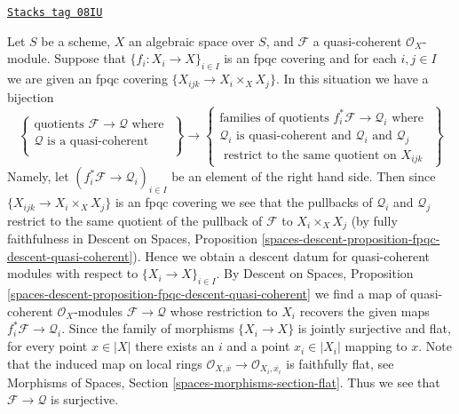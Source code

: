 \begin{remark}[Q sheaf]
\label{quot-remark-q-sheaf}
\href{https://stacks.math.columbia.edu/tag/08IU}{\texttt{Stacks tag 08IU}}

Let $S$ be a scheme, $X$ an algebraic space over $S$, and $\mathcal{F}$
a quasi-coherent $\mathcal{O}_X$-module. Suppose that
$\{f_i : X_i \to X\}_{i \in I}$
is an fpqc covering and for each $i, j \in I$ we are given an fpqc covering
$\{X_{ijk} \to X_i \times_X X_j\}$. In this situation we have a bijection
$$
\left\{
\begin{matrix}
\text{quotients }\mathcal{F} \to \mathcal{Q}\text{ where } \\
\mathcal{Q}\text{ is a quasi-coherent }\\
\end{matrix}
\right\}
\longrightarrow
\left\{
\begin{matrix}
\text{families of quotients }f_i^*\mathcal{F} \to \mathcal{Q}_i
\text{ where } \\
\mathcal{Q}_i\text{ is quasi-coherent and }
\mathcal{Q}_i\text{ and }\mathcal{Q}_j\\
\text{ restrict to the same quotient on }X_{ijk}
\end{matrix}
\right\}
$$
Namely, let $(f_i^*\mathcal{F} \to \mathcal{Q}_i)_{i \in I}$
be an element of the right hand side. Then since
$\{X_{ijk} \to X_i \times_X X_j\}$ is an fpqc covering we see that
the pullbacks of $\mathcal{Q}_i$ and $\mathcal{Q}_j$ restrict
to the same quotient of the pullback of $\mathcal{F}$ to $X_i \times_X X_j$
(by fully faithfulness in
Descent on Spaces, Proposition
\ref{spaces-descent-proposition-fpqc-descent-quasi-coherent}).
Hence we obtain a descent datum for quasi-coherent modules
with respect to $\{X_i \to X\}_{i \in I}$. By
Descent on Spaces, Proposition
\ref{spaces-descent-proposition-fpqc-descent-quasi-coherent}
we find a map of quasi-coherent $\mathcal{O}_X$-modules
$\mathcal{F} \to \mathcal{Q}$ whose restriction to $X_i$ recovers
the given maps $f_i^*\mathcal{F} \to \mathcal{Q}_i$.
Since the family of morphisms $\{X_i \to X\}$ is jointly surjective
and flat, for every point $x \in |X|$ there exists an $i$ and a point
$x_i \in |X_i|$ mapping to $x$. Note that the induced map on
local rings
$\mathcal{O}_{X, \overline{x}} \to \mathcal{O}_{X_i, \overline{x_i}}$
is faithfully flat, see
Morphisms of Spaces, Section \ref{spaces-morphisms-section-flat}.
Thus we see that $\mathcal{F} \to \mathcal{Q}$ is surjective.
\end{remark}

